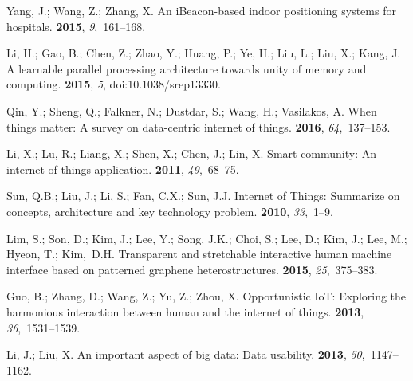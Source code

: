 \documentclass[symmetry,article,accept,moreauthors,pdftex10pt,a4paper]{mdpi}
\begin{document}
\begin{thebibliography}{999}
Yang, J.; Wang, Z.; Zhang, X. %
\newblock An iBeacon-based indoor positioning systems for hospitals.
 {\bf 2015}, {\em
	9},~161--168.

Li, H.; Gao, B.; Chen, Z.; Zhao, Y.; Huang, P.; Ye, H.; Liu, L.; Liu, X.; Kang,
J.
\newblock A learnable parallel processing architecture towards unity of memory
and computing.
 {\bf 2015}, {\em 5}, doi:10.1038/srep13330.

Qin, Y.; Sheng, Q.; Falkner, N.; Dustdar, S.; Wang, H.; Vasilakos, A.
\newblock When things matter: A survey on data-centric internet of things.
 {\bf 2016}, {\em
	64},~137--153.

Li, X.; Lu, R.; Liang, X.; Shen, X.; Chen, J.; Lin, X. %
\newblock Smart community: An internet of things application.
 {\bf 2011}, {\em 49},~68--75.

Sun, Q.B.; Liu, J.; Li, S.; Fan, C.X.; Sun, J.J. %
\newblock Internet of Things: Summarize on concepts, architecture and key
technology problem.
 {\bf 2010}, {\em 33},~1--9.

Lim, S.; Son, D.; Kim, J.; Lee, Y.; Song, J.K.; Choi, S.; Lee, D.; Kim, J.;
Lee, M.; Hyeon, T.; Kim,~D.H.
\newblock Transparent and stretchable interactive human machine interface based
on patterned graphene heterostructures.
 {\bf 2015}, {\em 25},~375--383.

Guo, B.; Zhang, D.; Wang, Z.; Yu, Z.; Zhou, X. %
\newblock Opportunistic IoT: Exploring the harmonious interaction between human
and the internet of things.
 {\bf 2013}, {\em
	36},~1531--1539.

Li, J.; Liu, X. %
\newblock An important aspect of big data: Data usability.
{\bf 2013}, {\em 50},~1147--1162.


\end{thebibliography}
\end{document}

